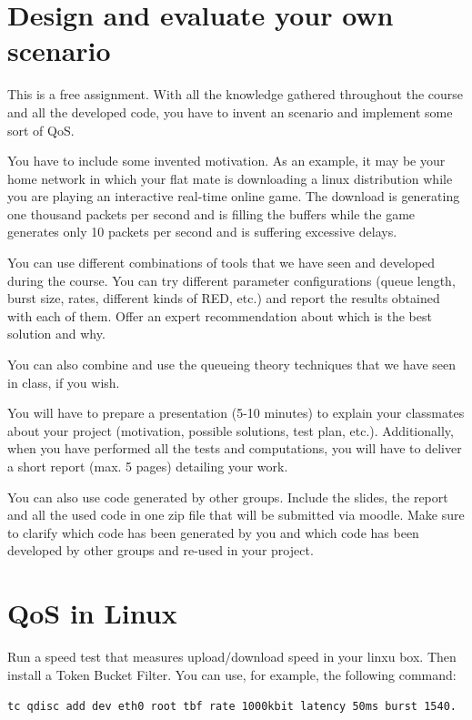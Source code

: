 \section{Design and evaluate your own scenario}

This is a free assignment.
With all the knowledge gathered throughout the course and all the developed code, you have to invent an scenario and implement some sort of QoS.

You have to include some invented motivation.
As an example, it may be your home network in which your flat mate is downloading a linux distribution while you are playing an interactive real-time online game.
The download is generating one thousand packets per second and is filling the buffers while the game generates only 10 packets per second and is suffering excessive delays.

You can use different combinations of tools that we have seen and developed during the course.
You can try different parameter configurations (queue length, burst size, rates, different kinds of RED, etc.) and report the results obtained with each of them.
Offer an expert recommendation about which is the best solution and why.

You can also combine and use the queueing theory techniques that we have seen in class, if you wish.

You will have to prepare a presentation (5-10 minutes) to explain your classmates about your project (motivation, possible solutions, test plan, etc.).
Additionally, when you have performed all the tests and computations, you will have to deliver a short report (max. 5 pages) detailing your work.

You can also use code generated by other groups.
Include the slides, the report and all the used code in one zip file that will be submitted via moodle.
Make sure to clarify which code has been generated by you and which code has been developed by other groups and re-used in your project.

\section{QoS in Linux}

Run a speed test that measures upload/download speed in your linxu box. 
Then install a Token Bucket Filter.
You can use, for example, the following command:

\texttt{tc qdisc add dev eth0 root tbf rate 1000kbit latency 50ms burst 1540.}

